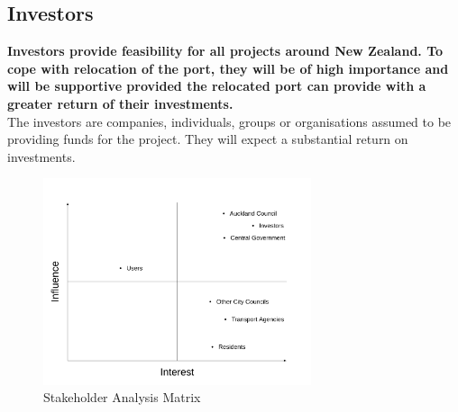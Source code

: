 \begin{multicols}{2}
\subsection*{Investors}
    \textbf{Investors provide feasibility for all projects around New Zealand. To cope with relocation of the port, they will be of high importance and will be supportive provided the relocated port can provide with a greater return of their investments.}
    \\The investors are companies, individuals, groups or organisations assumed to be providing funds for the project. They will expect a substantial return on investments.
    
\end{multicols}

\begin{figure}
\centering
\includegraphics[width=0.7\textwidth]{StakeholderMatrix.png}
\centering
\caption{Stakeholder Analysis Matrix}
\end{figure}


\clearpage